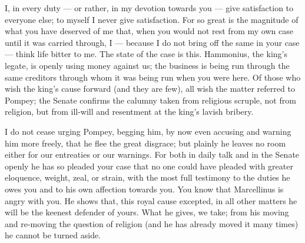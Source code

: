 

 I, in every duty --- or rather, in my devotion towards you --- give satisfaction to everyone else; to myself I never give satisfaction. For so great is the magnitude of what you have deserved of me that, when you would not rest from my own case until it was carried through, I --- because I do not bring off the same in your case --- think life bitter to me. The state of the case is this. Hammonius, the king's legate, is openly using money against us; the business is being run through the same creditors through whom it was being run when you were here. Of those who wish the king's cause forward (and they are few), all wish the matter referred to Pompey; the Senate confirms the calumny taken from religious scruple, not from religion, but from ill-will and resentment at the king's lavish bribery.

 I do not cease urging Pompey, begging him, by now even accusing and warning him more freely, that he flee the great disgrace; but plainly he leaves no room either for our entreaties or our warnings. For both in daily talk and in the Senate openly he has so pleaded your case that no one could have pleaded with greater eloquence, weight, zeal, or strain, with the most full testimony to the duties he owes you and to his own affection towards you. You know that Marcellinus is angry with you. He shows that, this royal cause excepted, in all other matters he will be the keenest defender of yours. What he gives, we take; from his moving and re-moving the question of religion (and he has already moved it many times) he cannot be turned aside.

